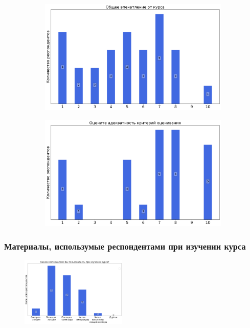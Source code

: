 		\begin{figure}[H]
			\centering
			\begin{subfigure}[b]{0.45\textwidth}
				\centering
				\includegraphics[width=\textwidth]{images/2 course/Радиотехнические цепи и сигналы/general-0.png}
			\end{subfigure}
			\begin{subfigure}[b]{0.45\textwidth}
				\centering
				\includegraphics[width=\textwidth]{images/2 course/Радиотехнические цепи и сигналы/general-1.png}
			\end{subfigure}	
		\end{figure}

	\subsubsection{Материалы, использумые респондентами при изучении курса}

		\begin{figure}[H]
			\centering
			\includegraphics[width = 0.45\textwidth]{images/2 course/Радиотехнические цепи и сигналы/materials.png}
		\end{figure}

